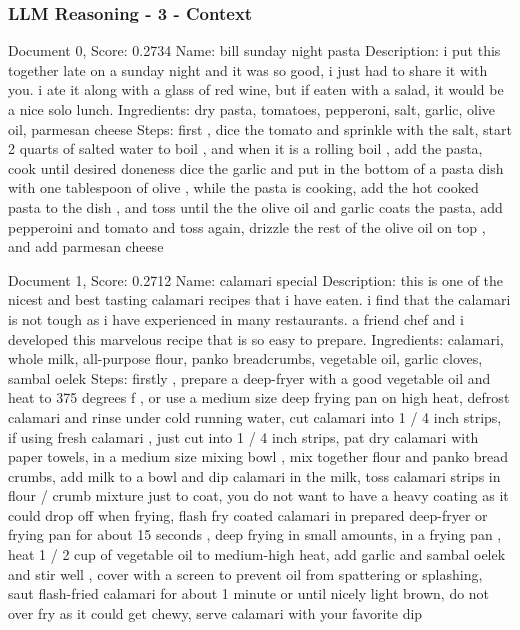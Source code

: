 \documentclass[a4paper,11pt]{article}
\begin{document}
\subsubsection{LLM Reasoning - 3 - Context}
Document 0, Score: 0.2734
Name: bill sunday night pasta
Description: i put this together late on a sunday night and it was so good, i just had to share it with you. i ate it along with a glass of red wine, but if eaten with a salad, it would be a nice solo lunch.
Ingredients: dry pasta, tomatoes, pepperoni, salt, garlic, olive oil, parmesan cheese
Steps: first , dice the tomato and sprinkle with the salt, start 2 quarts of salted water to boil , and when it is a rolling boil , add the pasta, cook until desired doneness dice the garlic and put in the bottom of a pasta dish with one tablespoon of olive , while the pasta is cooking, add the hot cooked pasta to the dish , and toss until the the olive oil and garlic coats the pasta, add pepperoini and tomato and toss again, drizzle the rest of the olive oil on top , and add parmesan cheese

Document 1, Score: 0.2712
Name: calamari special
Description: this is one of the nicest and best tasting calamari recipes that i have eaten. i find that the calamari is not tough as i have experienced in many restaurants. a friend chef and i developed this marvelous recipe that is so easy to prepare.
Ingredients: calamari, whole milk, all-purpose flour, panko breadcrumbs, vegetable oil, garlic cloves, sambal oelek
Steps: firstly , prepare a deep-fryer with a good vegetable oil and heat to 375 degrees f , or use a medium size deep frying pan on high heat, defrost calamari and rinse under cold running water, cut calamari into 1 / 4 inch strips, if using fresh calamari , just cut into 1 / 4 inch strips, pat dry calamari with paper towels, in a medium size mixing bowl , mix together flour and panko bread crumbs, add milk to a bowl and dip calamari in the milk, toss calamari strips in flour / crumb mixture just to coat, you do not want to have a heavy coating as it could drop off when frying, flash fry coated calamari in prepared deep-fryer or frying pan for about 15 seconds , deep frying in small amounts, in a frying pan , heat 1 / 2 cup of vegetable oil to medium-high heat, add garlic and sambal oelek and stir well , cover with a screen to prevent oil from spattering or splashing, saut flash-fried calamari for about 1 minute or until nicely light brown, do not over fry as it could get chewy, serve calamari with your favorite dip
\end{document}
